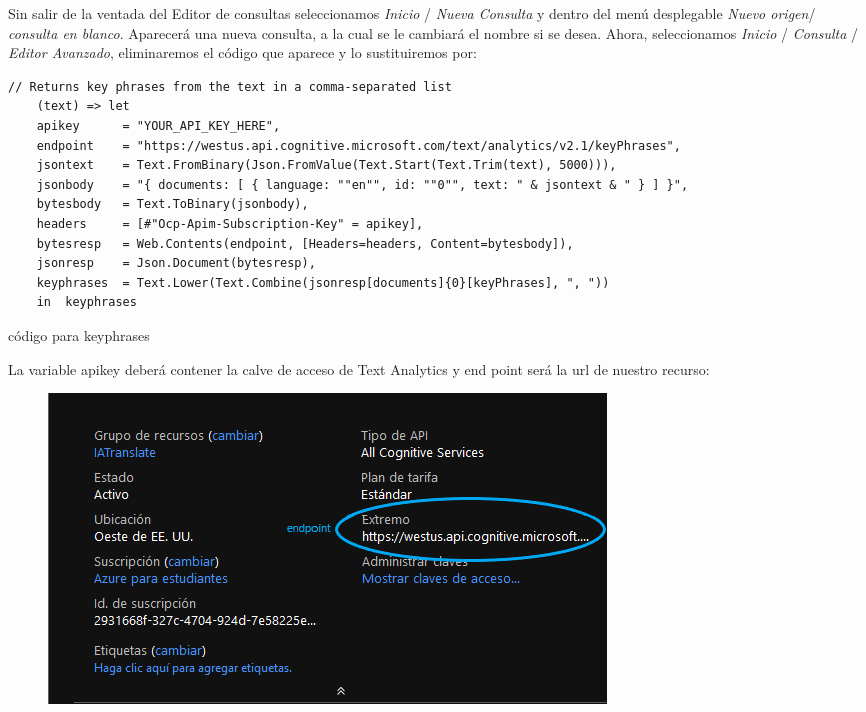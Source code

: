 \documentclass[english,runningheads,a4paper]{llncs}[2018/03/10]
\begin{document}
    Sin salir de la ventada del Editor de consultas seleccionamos 
    \textit{Inicio} / \textit{Nueva Consulta} y dentro del menú desplegable 
    \textit{Nuevo origen}/ \textit{consulta en blanco}. Aparecerá una nueva 
    consulta, a la cual se le cambiará el nombre si se desea.
    Ahora, seleccionamos \textit{Inicio} / \textit{Consulta} / 
    \textit{Editor Avanzado}, eliminaremos el código que aparece y lo 
    sustituiremos por:
    \small{
        \begin{listing}[]
        \centering
            \begin{verbatim}
// Returns key phrases from the text in a comma-separated list
    (text) => let
    apikey      = "YOUR_API_KEY_HERE",
    endpoint    = "https://westus.api.cognitive.microsoft.com/text/analytics/v2.1/keyPhrases",
    jsontext    = Text.FromBinary(Json.FromValue(Text.Start(Text.Trim(text), 5000))),
    jsonbody    = "{ documents: [ { language: ""en"", id: ""0"", text: " & jsontext & " } ] }",
    bytesbody   = Text.ToBinary(jsonbody),
    headers     = [#"Ocp-Apim-Subscription-Key" = apikey],
    bytesresp   = Web.Contents(endpoint, [Headers=headers, Content=bytesbody]),
    jsonresp    = Json.Document(bytesresp),
    keyphrases  = Text.Lower(Text.Combine(jsonresp[documents]{0}[keyPhrases], ", "))
    in  keyphrases
             \end{verbatim}
        \caption{código para keyphrases}
        \label{lst::comand}
        \end{listing}
}

    La variable apikey deberá contener la calve de acceso de Text Analytics y 
    end point será la url de nuestro recurso: 
    \begin{figure}[h!]
        \centering
        \includegraphics[scale=0.25]{./IA/AZURE/infoCog.png}
        \caption{}
    \end{figure}
    
\end{document}
